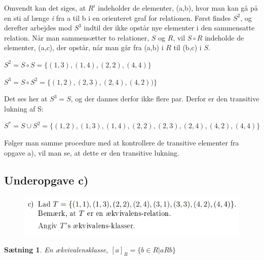 \documentclass{article}
\newtheorem{theorem}{Sætning}
\begin{document}
Omvendt kan det siges, at $R^i$ indeholder de elementer, (a,b), hvor man kan gå på en sti af længe \emph{i} fra a til b i en orienteret graf for relationen. Først findes $S^2$, og derefter arbejdes mod $S^3$ indtil der ikke opstår nye elementer i den sammensatte relation. Når man sammensætter to relationer, $S$ og $R$, vil $S \circ R$ indeholde de elementer, (a,c), der opstår, når man går fra (a,b) i $R$ til (b,c) i $S$.

\begin{center}
\begin{math}
S^2 = S \circ S = \{(1,3), (1,4), (2,2), (4,4)\}
\end{math}
\par
\begin{math}
S^3 = S \circ S^2 = \{(1,2), (2,3), (2,4), (4,2))\}
\end{math}
\end{center}
\par 
Det ses her at $S^3 = S$, og der dannes derfor ikke flere par. Derfor er den transitive lukning af S:

\begin{center}
\begin{math}
S^* = S \cup S^2 = \{(1,2), (1,3), (1,4), (2,2), (2,3), (2,4), (4,2), (4,4)\}
\end{math}
\end{center}

Følger man samme procedure med at kontrollere de transitive elementer fra opgave a), vil man se, at dette er den transitive lukning.

\subsection{Underopgave c)}
\begin{figure}[h]
\begin{center}
\includegraphics[scale=0.8]{2015Opgave3FormuleringC}
\end{center}
\end{figure}

\begin{theorem}
En ækvivalensklasse, $[a]_R = \{b \in R | aRb\}$
\end{theorem}
\end{document}
